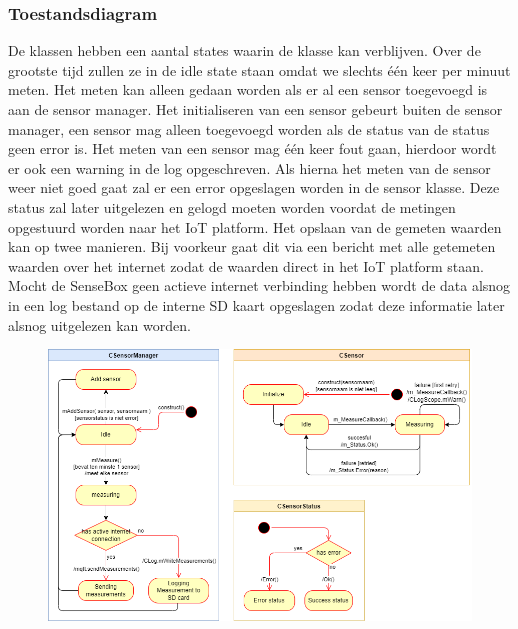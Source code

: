 \newpage
\subsubsection{Toestandsdiagram}
De klassen hebben een aantal states waarin de klasse kan verblijven. Over de grootste tijd zullen ze in de idle state staan omdat we slechts één keer per minuut meten. Het meten kan alleen gedaan worden als er al een sensor toegevoegd is aan de sensor manager. Het initialiseren van een sensor gebeurt buiten de sensor manager, een sensor mag alleen toegevoegd worden als de status van de status geen error is.
\vspace{1em}
Het meten van een sensor mag één keer fout gaan, hierdoor wordt er ook een warning in de log opgeschreven. Als hierna het meten van de sensor weer niet goed gaat zal er een error opgeslagen worden in de sensor klasse. Deze status zal later uitgelezen en gelogd moeten worden voordat de metingen opgestuurd worden naar het IoT platform.
\vspace{1em}
Het opslaan van de gemeten waarden kan op twee manieren. Bij voorkeur gaat dit via een bericht met alle getemeten waarden over het internet zodat de waarden direct in het IoT platform staan. Mocht de SenseBox geen actieve internet verbinding hebben wordt de data alsnog in een log bestand op de interne SD kaart opgeslagen zodat deze informatie later alsnog uitgelezen kan worden.

\begin{figure}[H]
  \centering
  \includegraphics[width=\columnwidth]{uml/sensor-state-diagram.png}
\end{figure}
